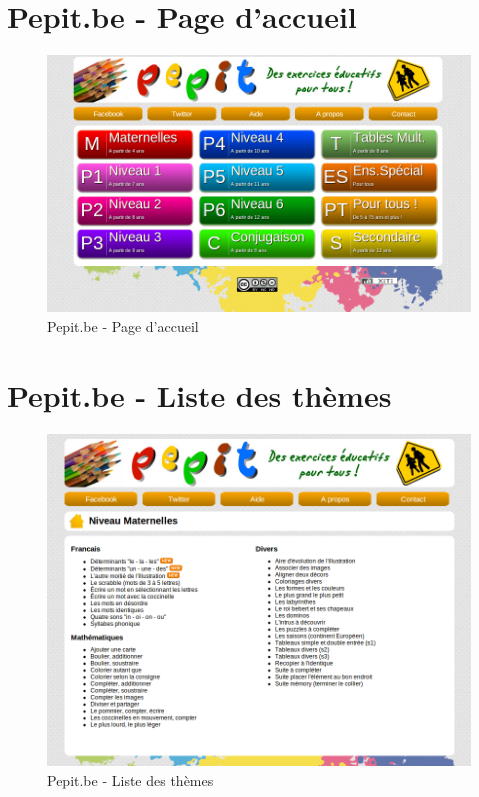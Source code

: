 \section*{Pepit.be - Page d'accueil}
\begin{figure}[H]
\begin{center}
\includegraphics[width=15cm]{images/pepit_be_homepage}
\end{center}
\caption{Pepit.be - Page d'accueil}
\label{Pepit.be - Page d'accueil}
\end{figure}

\section*{Pepit.be - Liste des thèmes}
\begin{figure}[H]
\begin{center}
\includegraphics[width=15cm]{images/pepit_be_list}
\end{center}
\caption{Pepit.be - Liste des thèmes}
\label{Pepit.be - Liste des thèmes}
\end{figure}

